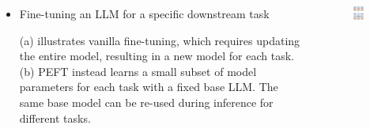 \documentclass[serif, aspectratio=169]{beamer}
\begin{document}
\begin{frame}{}
    \begin{columns}
        \begin{column}{0.5\textwidth}
            \begin{itemize}
                \item  
                    \large{Fine-tuning an LLM for a specific downstream task}
                    \vspace{0.5cm}
                    \begin{outline}
                        \1 (a) illustrates vanilla fine-tuning, which requires updating the entire model, resulting in a new model for each task.
                        \vspace{0.2cm}
                        \1 (b) PEFT instead learns a small subset of model parameters for each task with a fixed base LLM. The same base model can be re-used during inference for different tasks.
                    \end{outline}
                    \vspace{0.3cm}
            \end{itemize}
        \end{column}
        \begin{column}{0.5\textwidth}
            \begin{figure}
                \centering
                \includegraphics[width=0.75\textwidth, height=0.85\textheight]{pic/PEFTvsFT.PNG}
            \end{figure}
        \end{column}
    \end{columns}
\end{frame}
\end{document}
